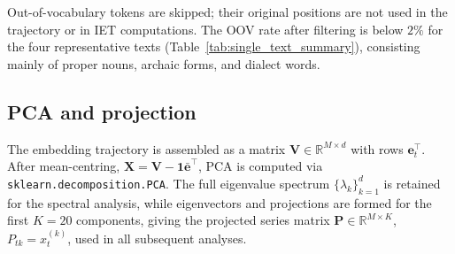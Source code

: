 \documentclass[preprint]{elsarticle}
\newcommand{\bk}{B_k}
\newcommand{\xtk}{x_t^{(k)}}
\newcommand{\et}{\mathbf{e}_t}
\newcommand{\ebar}{\bar{\mathbf{e}}}
\newcommand{\R}{\mathbb{R}}
\newcommand{\CV}{\mathrm{CV}}
\begin{document}
Out-of-vocabulary tokens are skipped; their original positions are not
used in the trajectory or in IET computations.
The OOV rate after filtering is below $2\%$ for the four representative
texts (Table~\ref{tab:single_text_summary}), consisting mainly of
proper nouns, archaic forms, and dialect words.

\subsection{PCA and projection}
\label{sec:pca_pipeline}

The embedding trajectory is assembled as a matrix
$\mathbf{V} \in \R^{M \times d}$ with rows $\et^\top$.
After mean-centring, $\mathbf{X} = \mathbf{V} - \mathbf{1}\ebar^\top$,
PCA is computed via \texttt{sklearn.decomposition.PCA}.
The full eigenvalue spectrum $\{\lambda_k\}_{k=1}^{d}$ is retained for
the spectral analysis, while eigenvectors and projections are formed for
the first $K = 20$ components, giving the projected series matrix
$\mathbf{P} \in \R^{M \times K}$, $P_{tk} = \xtk$, used in all
subsequent analyses.

%
%
%
%
%
%
\end{document}
